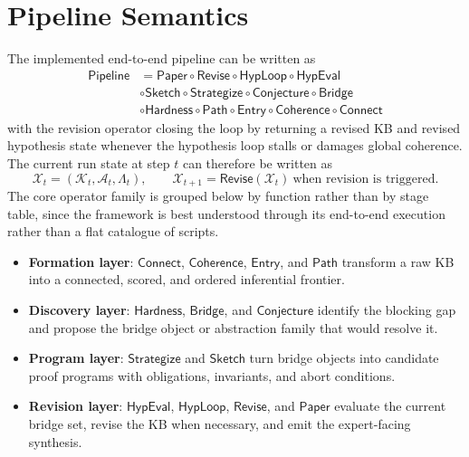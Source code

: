 \documentclass[11pt]{article}
\begin{document}
\section{Pipeline Semantics}
The implemented end-to-end pipeline can be written as
\[
\begin{aligned}\mathsf{Pipeline} &= \mathsf{Paper} \circ \mathsf{Revise} \circ \mathsf{HypLoop} \circ \mathsf{HypEval} \\&\circ \mathsf{Sketch} \circ \mathsf{Strategize} \circ \mathsf{Conjecture} \circ \mathsf{Bridge} \\&\circ \mathsf{Hardness} \circ \mathsf{Path} \circ \mathsf{Entry} \circ \mathsf{Coherence} \circ \mathsf{Connect}\end{aligned}
\]
with the revision operator closing the loop by returning a revised KB and revised hypothesis state whenever the hypothesis loop stalls or damages global coherence.
The current run state at step $t$ can therefore be written as
\[
\mathcal{X}_t = (\mathcal{K}_t, \mathcal{A}_t, \Lambda_t), \qquad \mathcal{X}_{t+1} = \mathsf{Revise}(\mathcal{X}_t) \ \text{when revision is triggered}.
\]
The core operator family is grouped below by function rather than by stage table, since the framework is best understood through its end-to-end execution rather than a flat catalogue of scripts.
\begin{itemize}[leftmargin=*,itemsep=0.25em]
\item \textbf{Formation layer}: $\mathsf{Connect}$, $\mathsf{Coherence}$, $\mathsf{Entry}$, and $\mathsf{Path}$ transform a raw KB into a connected, scored, and ordered inferential frontier.
\item \textbf{Discovery layer}: $\mathsf{Hardness}$, $\mathsf{Bridge}$, and $\mathsf{Conjecture}$ identify the blocking gap and propose the bridge object or abstraction family that would resolve it.
\item \textbf{Program layer}: $\mathsf{Strategize}$ and $\mathsf{Sketch}$ turn bridge objects into candidate proof programs with obligations, invariants, and abort conditions.
\item \textbf{Revision layer}: $\mathsf{HypEval}$, $\mathsf{HypLoop}$, $\mathsf{Revise}$, and $\mathsf{Paper}$ evaluate the current bridge set, revise the KB when necessary, and emit the expert-facing synthesis.
\end{itemize}
\end{document}

